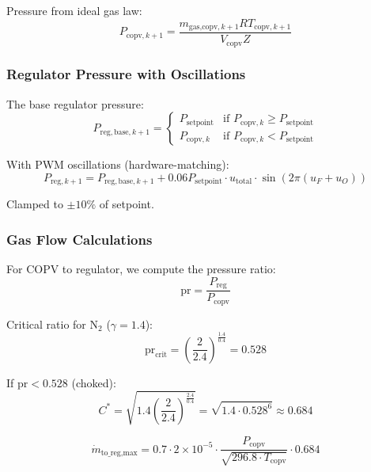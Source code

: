 \documentclass[11pt,a4paper]{article}
\begin{document}
Pressure from ideal gas law:
\begin{equation}
P_{\text{copv},k+1} = \frac{m_{\text{gas,copv},k+1} R T_{\text{copv},k+1}}{V_{\text{copv}} Z}
\end{equation}

\subsubsection{Regulator Pressure with Oscillations}

The base regulator pressure:
\begin{equation}
P_{\text{reg},\text{base},k+1} = \begin{cases}
P_{\text{setpoint}} & \text{if } P_{\text{copv},k} \geq P_{\text{setpoint}} \\
P_{\text{copv},k} & \text{if } P_{\text{copv},k} < P_{\text{setpoint}}
\end{cases}
\end{equation}

With PWM oscillations (hardware-matching):
\begin{equation}
P_{\text{reg},k+1} = P_{\text{reg},\text{base},k+1} + 0.06 P_{\text{setpoint}} \cdot u_{\text{total}} \cdot \sin(2\pi (u_F + u_O))
\end{equation}

Clamped to $\pm 10\%$ of setpoint.

\subsubsection{Gas Flow Calculations}

For COPV to regulator, we compute the pressure ratio:
\begin{equation}
\text{pr} = \frac{P_{\text{reg}}}{P_{\text{copv}}}
\end{equation}

Critical ratio for N$_2$ ($\gamma = 1.4$):
\begin{equation}
\text{pr}_{\text{crit}} = \left(\frac{2}{2.4}\right)^{\frac{1.4}{0.4}} = 0.528
\end{equation}

If $\text{pr} < 0.528$ (choked):
\begin{equation}
C^* = \sqrt{1.4 \left(\frac{2}{2.4}\right)^{\frac{2.4}{0.4}}} = \sqrt{1.4 \cdot 0.528^{6}} \approx 0.684
\end{equation}

\begin{equation}
\dot{m}_{\text{to\_reg},\text{max}} = 0.7 \cdot 2 \times 10^{-5} \cdot \frac{P_{\text{copv}}}{\sqrt{296.8 \cdot T_{\text{copv}}}} \cdot 0.684
\end{equation}
\end{document}
